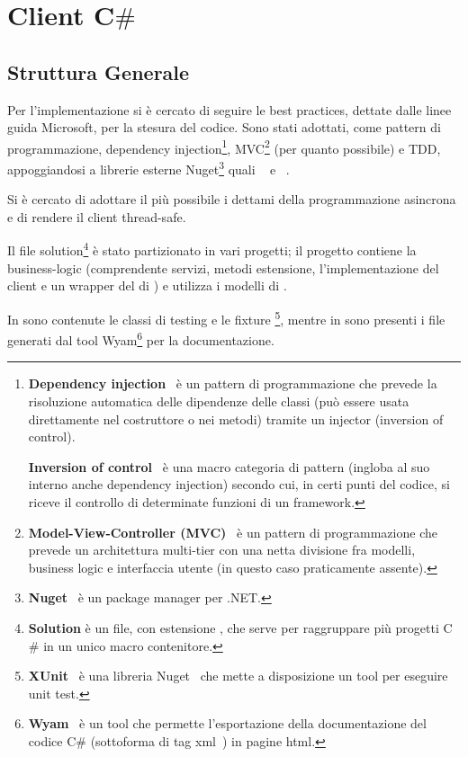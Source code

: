 
\chapter{Client C$\#$}
\section{Struttura Generale}

Per l'implementazione si è cercato di seguire le best practices, dettate dalle linee guida Microsoft, per la stesura del codice.
Sono stati adottati, come pattern di programmazione, dependency injection\footnote{
    \textbf{Dependency injection}~\cite{dependency-injection} è un pattern di programmazione che prevede la risoluzione automatica delle dipendenze delle classi 
    (può essere usata direttamente nel costruttore o nei metodi) tramite un injector (inversion of control).

        \textbf{Inversion of control}~\cite{inversion-of-control} è una macro categoria di pattern (ingloba al suo interno anche dependency injection)
        secondo cui, in certi punti del codice, si riceve il controllo di determinate funzioni di un framework.
}, MVC\footnote{
    \textbf{Model-View-Controller (MVC)}~\cite{mvc} è un pattern di programmazione che prevede un architettura multi-tier con una netta divisione fra modelli, 
    business logic e interfaccia utente (in questo caso praticamente assente).
} (per quanto possibile) e TDD, appoggiandosi a librerie esterne Nuget\footnote{
    \textbf{Nuget}~\cite{nuget} è un package manager per .NET.
} quali ~\cite{newtonsoft-json} e ~\cite{simple-injector}. 

Si è cercato di adottare il più possibile i dettami della programmazione asincrona e di rendere il client thread-safe.

Il file solution\footnote{
    \textbf{Solution} è un file, con estensione , che serve per raggruppare più progetti C$\#$ in un unico macro contenitore.  
} è stato partizionato in vari progetti; il progetto  contiene la business-logic 
(comprendente servizi, metodi estensione, l'implementazione del client e un wrapper del  di ) e utilizza i modelli di .

In  sono contenute le classi di testing e le fixture \footnote{
    \textbf{XUnit}~\cite{xunit-repo} è una libreria Nuget~\cite{xunit} che mette a disposizione un tool per eseguire unit test.     
}, mentre in  sono presenti i file generati dal tool Wyam\footnote{
    \textbf{Wyam}~\cite{wyam} è un tool che permette l'esportazione della documentazione del codice C$\#$ 
    (sottoforma di tag xml~\cite{code-doc}) in pagine html.
} per la documentazione.

